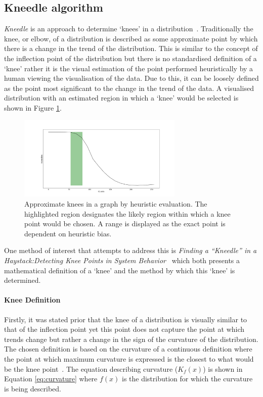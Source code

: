 \subsection{Kneedle algorithm} \label{sec:kneedle}
\textit{Kneedle} is an approach to determine `knees' in a distribution~\cite{kneedle_paper}. Traditionally the knee, or elbow, of a distribution is described as some approximate point by which there is a change in the trend of the distribution. This is similar to the concept of the inflection point of the distribution but there is no standardised definition of a `knee' rather it is the visual estimation of the point performed heuristically by a human viewing the visualisation of the data. Due to this, it can be loosely defined as the point most significant to the change in the trend of the data. A visualised distribution with an estimated region in which a `knee' would be selected is shown in Figure \ref{fig:knees}.\par
\begin{figure}
    \centering
    \includegraphics[width=0.7\textwidth]{figs/ch2figs/knees.png}
    \caption[Approximate knees in a graph by heuristic evaluation]{Approximate knees in a graph by heuristic evaluation. The highlighted region designates the likely region within which a knee point would be chosen. A range is displayed as the exact point is dependent on heuristic bias.}
    \label{fig:knees}
\end{figure}
One method of interest that attempts to address this is \textit{Finding a ``Kneedle'' in a Haystack:Detecting Knee Points in System Behavior}~\cite{kneedle_paper} which both presents a mathematical definition of a `knee' and the method by which this `knee' is determined. \paragraph{Knee Definition} Firstly, it was stated prior that the knee of a distribution is visually similar to that of the inflection point yet this point does not capture the point at which trends change but rather a change in the sign of the curvature of the distribution. The chosen definition is based on the curvature of a continuous definition where the point at which maximum curvature is expressed is the closest to what would be the knee point~\cite[p.2]{kneedle_paper}. The equation describing curvature ($K_f(x)$) is shown in Equation \ref{eq:curvature} where $f(x)$ is the distribution for which the curvature is being described.\par
